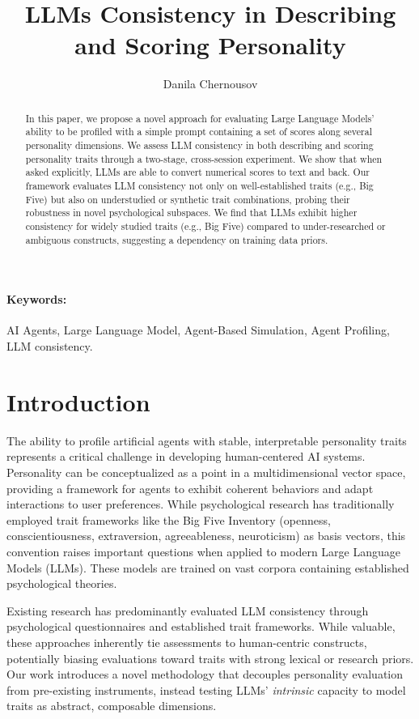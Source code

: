 \documentclass[12pt]{article}
\title{LLMs Consistency in Describing and Scoring Personality}
\author{
  Danila Chernousov\\
}
\begin{document}
\maketitle

\begin{abstract}
In this paper, we propose a novel approach for evaluating Large Language Models' ability to be profiled with a simple prompt containing a set of scores along several personality dimensions. We assess LLM consistency in both describing and scoring personality traits through a two-stage, cross-session experiment. We show that when asked explicitly, LLMs are able to convert numerical scores to text and back. Our framework evaluates LLM consistency not only on well-established traits (e.g., Big Five) but also on understudied or synthetic trait combinations, probing their robustness in novel psychological subspaces. We find that LLMs exhibit higher consistency for widely studied traits (e.g., Big Five) compared to under-researched or ambiguous constructs, suggesting a dependency on training data priors.
\end{abstract}

\paragraph{Keywords:} AI Agents, Large Language Model, Agent-Based Simulation, Agent Profiling, LLM consistency.

\section{Introduction}
The ability to profile artificial agents with stable, interpretable personality traits represents a critical challenge in developing human-centered AI systems. Personality can be conceptualized as a point in a multidimensional vector space, providing a framework for agents to exhibit coherent behaviors and adapt interactions to user preferences. While psychological research has traditionally employed trait frameworks like the Big Five Inventory (openness, conscientiousness, extraversion, agreeableness, neuroticism) as basis vectors, this convention raises important questions when applied to modern Large Language Models (LLMs). These models are trained on vast corpora containing established psychological theories.

Existing research has predominantly evaluated LLM consistency through psychological questionnaires and established trait frameworks. While valuable, these approaches inherently tie assessments to human-centric constructs, potentially biasing evaluations toward traits with strong lexical or research priors. Our work introduces a novel methodology that decouples personality evaluation from pre-existing instruments, instead testing LLMs' \emph{intrinsic} capacity to model traits as abstract, composable dimensions.
\end{document}
